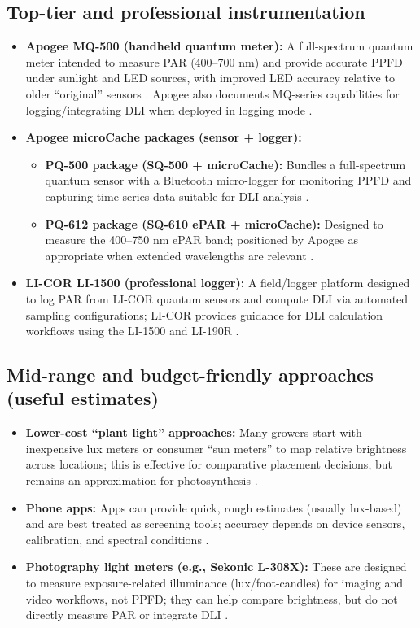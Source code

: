 \documentclass[11pt]{article}
\begin{document}
\subsection{Top-tier and professional instrumentation}
\begin{itemize}
  \item \textbf{Apogee MQ-500 (handheld quantum meter):} A full-spectrum quantum meter intended to measure PAR (400--700 nm) and provide accurate PPFD under sunlight and LED sources, with improved LED accuracy relative to older ``original'' sensors \cite{apogee_mq500_page}. Apogee also documents MQ-series capabilities for logging/integrating DLI when deployed in logging mode \cite{apogee_dli_measuring,apogee_mq500_pdf}.
  \item \textbf{Apogee microCache packages (sensor + logger):}
    \begin{itemize}
      \item \textbf{PQ-500 package (SQ-500 + microCache):} Bundles a full-spectrum quantum sensor with a Bluetooth micro-logger for monitoring PPFD and capturing time-series data suitable for DLI analysis \cite{apogee_pq500}.
      \item \textbf{PQ-612 package (SQ-610 ePAR + microCache):} Designed to measure the 400--750 nm ePAR band; positioned by Apogee as appropriate when extended wavelengths are relevant \cite{apogee_pq612}.
    \end{itemize}
  \item \textbf{LI-COR LI-1500 (professional logger):} A field/logger platform designed to log PAR from LI-COR quantum sensors and compute DLI via automated sampling configurations; LI-COR provides guidance for DLI calculation workflows using the LI-1500 and LI-190R \cite{licor_calculating_dli,licor_li1500_product}.
\end{itemize}

\subsection{Mid-range and budget-friendly approaches (useful estimates)}
\begin{itemize}
  \item \textbf{Lower-cost ``plant light'' approaches:} Many growers start with inexpensive lux meters or consumer ``sun meters'' to map relative brightness across locations; this is effective for comparative placement decisions, but remains an approximation for photosynthesis \cite{gardenerspath_best_light_meters}.
  \item \textbf{Phone apps:} Apps can provide quick, rough estimates (usually lux-based) and are best treated as screening tools; accuracy depends on device sensors, calibration, and spectral conditions \cite{photone_app_article}.
  \item \textbf{Photography light meters (e.g., Sekonic L-308X):} These are designed to measure exposure-related illuminance (lux/foot-candles) for imaging and video workflows, not PPFD; they can help compare brightness, but do not directly measure PAR or integrate DLI \cite{sekonic_l308x}.
\end{itemize}
\end{document}
